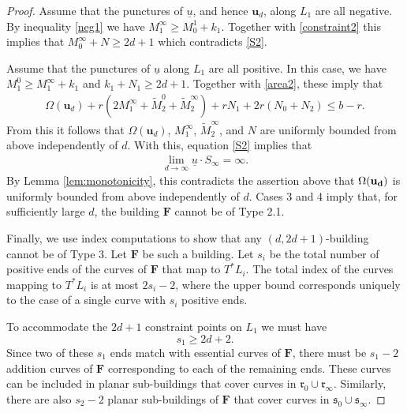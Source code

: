 \documentclass[12pt]{amsart}
\theoremstyle{definition}
\begin{document}
\begin{proof}
\medskip
 
  Assume that the punctures of $\underline{u}$, and hence $\mathbf{u}_d$, along $L_1$ are all negative. By inequality \eqref{neg1} we have $M^{\infty}_1 \geq M^1_0 +k_1$. Together with \eqref{constraint2} this implies that $M^\infty_0 + N \geq 2d+1$ which contradicts \eqref{S2}.

\medskip

 Assume that  the punctures of $\underline{u}$ along $L_1$ are all positive. In this case, we have $M_1^0 \geq M_1^\infty + k_1 $ and  $k_1 +N_1 \geq 2d+1$. Together with \eqref{area2}, these imply that
\begin{align*}
\Omega(\mathbf{u}_d)+ r(2M_1^\infty + \widetilde{M}_2^0 + \widetilde{M}_2^\infty)+rN_1 +2r(N_0 + N_2)  \leq b-r.  
\end{align*}
From this it follows that $\Omega(\mathbf{u}_d)$,  $M_1^\infty$, $\widetilde{M}_2^\infty$, and $N$ are uniformly bounded from above independently of $d$. With this, equation  \eqref{S2} implies that  \begin{align*}\lim_{d \to \infty} \underline{u} \cdot S_{\infty} = \infty.\end{align*} By Lemma \ref{lem:monotonicity}, this contradicts the assertion above that $\Omega(\bf{u}_d)$ is uniformly bounded from above independently of $d$. Cases 3 and 4 imply that, for sufficiently large $d$, the building $\mathbf{F}$ cannot be of Type 2.1.

\medskip


Finally, we use index computations to show that any  $(d,2d+1)$-building  cannot be of Type $3$. Let $\mathbf{F}$ be such a building.  Let $s_i$ be the total number of positive ends of the curves of $\mathbf{F}$ that map to $T^*L_i$. The total index of the curves mapping to $T^*L_i$ is at most $2s_i -2$, where the upper bound corresponds uniquely to the case of a single curve with $s_i$ positive ends. 

To accommodate the $2d+1$ constraint points on $L_1$ we must have \begin{equation}\label{eq:s1}
    s_1  \geq 2d+2.
\end{equation}
Since two of these $s_1$ ends match with essential curves of $\mathbf{F}$, there must be $s_1 -2$ addition curves of $\mathbf{F}$ corresponding to each of the remaining ends. These curves can be included in planar sub-buildings that cover curves in $\mathfrak{r}_0 \cup \mathfrak{r}_\infty$. Similarly, 
there are also $s_2 -2$ planar sub-buildings of $\mathbf{F}$ that cover curves in $\mathfrak{s}_0 \cup \mathfrak{s}_\infty$.  %


\end{proof}
\end{document}
